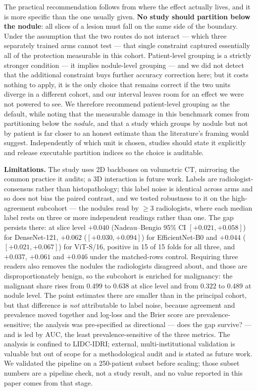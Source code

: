 \documentclass{ieeeaccess}
\begin{document}
The practical recommendation follows from where the effect actually lives, and it is more specific
than the one usually given. \textbf{No study should partition below the nodule}: all slices of a lesion
must fall on the same side of the boundary. Under the assumption that the two routes do not
interact --- which three separately trained arms cannot test --- that single constraint captured
essentially all of the protection measurable in this cohort. Patient-level grouping is a strictly stronger condition --- it
implies nodule-level grouping --- and we did not detect that the additional constraint buys further
accuracy correction here; but it costs nothing to apply, it is the only choice that remains correct
if the two units diverge in a different cohort, and our interval leaves room for an effect we were
not powered to see. We therefore recommend patient-level grouping as the default, while noting that
the measurable damage in this benchmark comes from partitioning below the \emph{nodule}, and that a
study which groups by nodule but not by patient is far closer to an honest estimate than the
literature's framing would suggest. Independently of which unit is chosen, studies should state it
explicitly and release executable partition indices so the choice is auditable.

\textbf{Limitations.} The study uses 2D backbones on volumetric CT, mirroring the common practice
it audits; a 3D interaction is future work. Labels are radiologist-consensus rather than
histopathology; this label noise is identical across arms and so does not bias the paired contrast,
and we tested robustness to it on the high-agreement subcohort --- the nodules read by $\geq 3$
radiologists, where each median label rests on three or more independent readings rather than one. The gap
persists there: at slice level $+0.040$ (Nadeau--Bengio 95\% CI $[+0.021, +0.058]$) for DenseNet-121,
$+0.062$ ($[+0.030, +0.094]$) for EfficientNet-B0 and $+0.044$ ($[+0.021, +0.067]$) for ViT-S/16,
positive in 15 of 15 folds for all three, and
$+0.037$, $+0.061$ and $+0.046$ under the matched-rows control. Requiring three readers also removes the
nodules the radiologists disagreed about, and those are disproportionately benign, so the subcohort
is enriched for malignancy: the malignant share rises from $0.499$ to $0.638$ at slice level and from
$0.322$ to $0.489$ at nodule level. The point estimates there are smaller than in the principal
cohort, but that difference is \emph{not} attributable to label noise, because agreement and
prevalence moved together and log-loss and the Brier score are prevalence-sensitive; the analysis was
pre-specified as directional --- does the gap survive? --- and is led by AUC, the least
prevalence-sensitive of the three metrics.
The analysis is confined to LIDC-IDRI; external, multi-institutional validation is
valuable but out of scope for a methodological audit and is stated as future work. We validated the
pipeline on a 250-patient subset before scaling; those subset numbers are a pipeline check, not a
study result, and no value reported in this paper comes from that stage.
\end{document}
